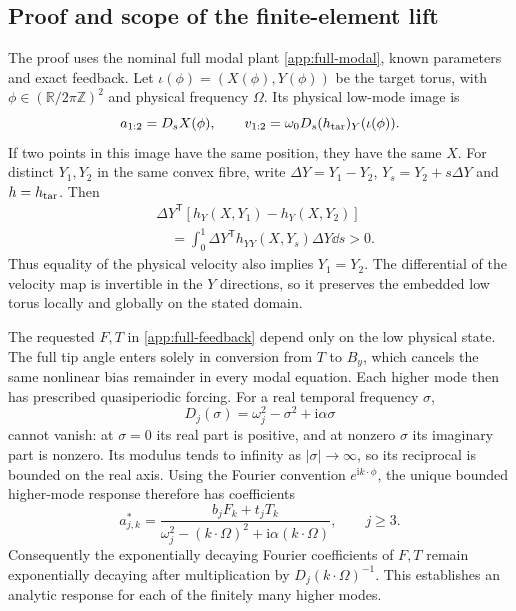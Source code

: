 \subsection{Proof and scope of the finite-element lift}
\label{sm:lift}
The proof uses the nominal full modal plant
\eqref{app:full-modal}, known parameters and exact feedback.
Let $\iota(\phi)=(X(\phi),Y(\phi))$ be the target torus, with
$\phi\in(\mathbb R/2\pi\mathbb Z)^2$ and physical frequency $\Omega$.
Its physical low-mode image is
\begin{equation}
 a_{1:2}=D_sX(\phi),\qquad
 v_{1:2}=\omega_0D_s(h_{\rm tar})_Y(\iota(\phi)).
 \label{sm:physical-embedding}
\end{equation}
If two points in this image have the same position, they have the same
$X$. For distinct $Y_1,Y_2$ in the same convex fibre, write
$\Delta Y=Y_1-Y_2$, $Y_s=Y_2+s\Delta Y$ and $h=h_{\rm tar}$. Then
\begin{align}
 &\Delta Y^{\mathsf T}[h_Y(X,Y_1)-h_Y(X,Y_2)]\nonumber\\
 &\quad=\int_0^1
 \Delta Y^{\mathsf T}h_{YY}(X,Y_s)\Delta Y\dd s>0.
 \label{sm:velocity-injectivity}
\end{align}
Thus equality of the physical velocity also implies $Y_1=Y_2$.
The differential of the velocity map is invertible in the $Y$
directions, so it preserves the embedded low torus locally and
globally on the stated domain.

The requested $F,T$ in \eqref{app:full-feedback} depend only on the low
physical state. The full tip angle enters solely in conversion from
$T$ to $B_y$, which cancels the same nonlinear bias remainder in every
modal equation. Each higher mode then has prescribed quasiperiodic
forcing. For a real temporal frequency $\sigma$,
\begin{equation}
 D_j(\sigma)=\omega_j^2-\sigma^2+\mathrm i\alpha\sigma
 \label{sm:stable-resolvent}
\end{equation}
cannot vanish: at $\sigma=0$ its real part is positive, and at nonzero
$\sigma$ its imaginary part is nonzero. Its modulus tends to infinity
as $|\sigma|\to\infty$, so its reciprocal is bounded on the real
axis. Using the Fourier convention $e^{\mathrm i k\cdot\phi}$,
the unique bounded higher-mode response therefore has coefficients
\begin{equation}
 a^*_{j,k}=
 \frac{b_jF_k+t_jT_k}
 {\omega_j^2-(k\cdot\Omega)^2+\mathrm i\alpha(k\cdot\Omega)},
 \qquad j\ge3.
 \label{app:response-coefficients}
\end{equation}
Consequently the exponentially decaying Fourier coefficients of
$F,T$ remain exponentially decaying after multiplication by
$D_j(k\cdot\Omega)^{-1}$. This establishes an analytic response
for each of the finitely many higher modes.

